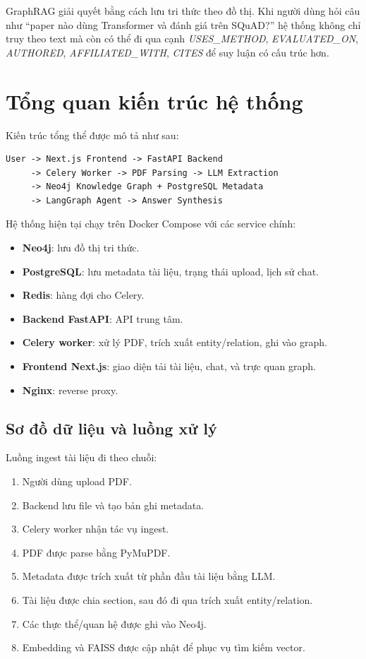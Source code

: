 \documentclass[12pt,a4paper]{article}
\begin{document}
GraphRAG giải quyết bằng cách lưu tri thức theo đồ thị. Khi người dùng hỏi câu như ``paper nào dùng Transformer và đánh giá trên SQuAD?'' hệ thống không chỉ truy theo text mà còn có thể đi qua cạnh \textit{USES\_METHOD}, \textit{EVALUATED\_ON}, \textit{AUTHORED}, \textit{AFFILIATED\_WITH}, \textit{CITES} để suy luận có cấu trúc hơn.

\section{Tổng quan kiến trúc hệ thống}
Kiến trúc tổng thể được mô tả như sau:

\begin{lstlisting}[style=codeblock,caption={Luồng kiến trúc mức cao}]
User -> Next.js Frontend -> FastAPI Backend
     -> Celery Worker -> PDF Parsing -> LLM Extraction
     -> Neo4j Knowledge Graph + PostgreSQL Metadata
     -> LangGraph Agent -> Answer Synthesis
\end{lstlisting}

Hệ thống hiện tại chạy trên Docker Compose với các service chính:
\begin{itemize}[leftmargin=1.6em]
  \item \textbf{Neo4j}: lưu đồ thị tri thức.
  \item \textbf{PostgreSQL}: lưu metadata tài liệu, trạng thái upload, lịch sử chat.
  \item \textbf{Redis}: hàng đợi cho Celery.
  \item \textbf{Backend FastAPI}: API trung tâm.
  \item \textbf{Celery worker}: xử lý PDF, trích xuất entity/relation, ghi vào graph.
  \item \textbf{Frontend Next.js}: giao diện tải tài liệu, chat, và trực quan graph.
  \item \textbf{Nginx}: reverse proxy.
\end{itemize}

\subsection{Sơ đồ dữ liệu và luồng xử lý}
Luồng ingest tài liệu đi theo chuỗi:
\begin{enumerate}[leftmargin=1.6em]
  \item Người dùng upload PDF.
  \item Backend lưu file và tạo bản ghi metadata.
  \item Celery worker nhận tác vụ ingest.
  \item PDF được parse bằng PyMuPDF.
  \item Metadata được trích xuất từ phần đầu tài liệu bằng LLM.
  \item Tài liệu được chia section, sau đó đi qua trích xuất entity/relation.
  \item Các thực thể/quan hệ được ghi vào Neo4j.
  \item Embedding và FAISS được cập nhật để phục vụ tìm kiếm vector.
\end{enumerate}
\end{document}
